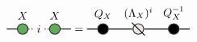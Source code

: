
\renewcommand{\graphTensorSpacing}{1.1}
\renewcommand{\graphTensorTwoStart}{2.25*\graphTensorSpacing}
\[
\begin{tikzpicture}[baseline=-0.65ex]
	\node[circle,draw=black!80,thick,fill=myGreen,label=above:$X$] (X) at (0,0) {};
	\node (i) at (\graphLineSpacing,0) {$i$};
	\node[circle,draw=black!80,thick,fill=myGreen,label=above:$X$] (X1) at (2*\graphLineSpacing,0) {};

	\draw[thick, draw=black] (-\graphLineSpacing,0) -- (X) {};
	\draw[thick, dotted] (X) -- (i) -- (X1) {};
	\draw[thick, draw=black]  (X1) -- (3*\graphLineSpacing,0){};
\end{tikzpicture}
=
\begin{tikzpicture}[baseline=-0.65ex]
	\node[circle,draw=black!80,thick,fill=black,label=above:$Q_X$] (Q) at (0,0) {};
	
	\node[circle,draw=black!80,thick,fill=myGrey,label=above:$(\Lambda_X)^i$] (LAMBDA) at (\graphTensorSpacing,0) {};
	\draw[thick] (\graphTensorSpacing - 0.2,0 + 0.2) -- (\graphTensorSpacing + 0.2,0 - 0.2) {};

	\node[circle,draw=black!80,thick,fill=black,label=above:$Q_X^{-1}$] (Q1) at (2*\graphTensorSpacing,0) {};

	\draw[thick, draw=black] (-\graphLineSpacing,0) -- (Q) -- (LAMBDA) -- (Q1) -- (2*\graphTensorSpacing + \graphLineSpacing,0) {};

\end{tikzpicture}
\]